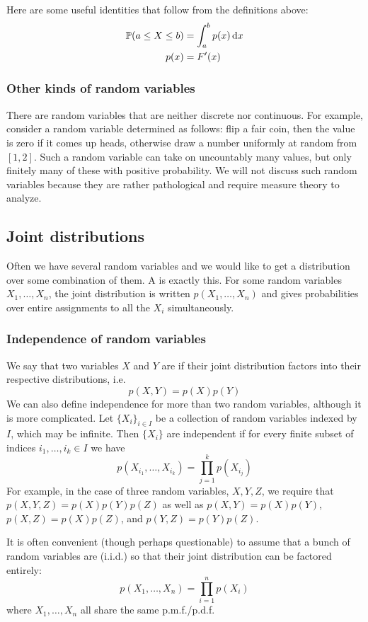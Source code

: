 Here are some useful identities that follow from the definitions above:
\begin{align*}
\mathbb{P}(a \leq X \leq b) &= \int_a^b p(x)\dd{x} \\
p(x) &= F'(x)
\end{align*}

\subsubsection{Other kinds of random variables}
There are random variables that are neither discrete nor continuous.
For example, consider a random variable determined as follows:
flip a fair coin, then the value is zero if it comes up heads, otherwise draw a number uniformly at random from $[1,2]$.
Such a random variable can take on uncountably many values, but only finitely many of these with positive probability.
We will not discuss such random variables because they are rather pathological and require measure theory to analyze.

\subsection{Joint distributions}
Often we have several random variables and we would like to get a distribution over some combination of them.
A  is exactly this.
For some random variables $X_1, \dots, X_n$, the joint distribution is written $p(X_1, \dots, X_n)$ and gives probabilities over entire assignments to all the $X_i$ simultaneously.

\subsubsection{Independence of random variables}
We say that two variables $X$ and $Y$ are  if their joint distribution factors into their respective distributions, i.e.
\[p(X, Y) = p(X)p(Y)\]
We can also define independence for more than two random variables, although it is more complicated.
Let $\{X_i\}_{i \in I}$ be a collection of random variables indexed by $I$, which may be infinite.
Then $\{X_i\}$ are independent if for every finite subset of indices $i_1, \dots, i_k \in I$ we have
\[p(X_{i_1}, \dots, X_{i_k}) = \prod_{j=1}^k p(X_{i_j})\]
For example, in the case of three random variables, $X, Y, Z$, we require that $p(X,Y,Z) = p(X)p(Y)p(Z)$ as well as $p(X,Y) = p(X)p(Y)$, $p(X,Z) = p(X)p(Z)$, and $p(Y,Z) = p(Y)p(Z)$.

It is often convenient (though perhaps questionable) to assume that a bunch of random variables are  (i.i.d.) so that their joint distribution can be factored entirely:
\[p(X_1, \dots, X_n) = \prod_{i=1}^n p(X_i)\]
where $X_1, \dots, X_n$ all share the same p.m.f./p.d.f.

